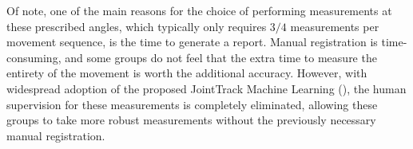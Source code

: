 Of note, one of the main reasons for the choice of performing measurements at these prescribed angles, which typically only requires $3/4$ measurements per movement sequence, is the time to generate a report.
Manual registration is time-consuming, and some groups do not feel that the extra time to measure the entirety of the movement is worth the additional accuracy.
However, with widespread adoption of the proposed JointTrack Machine Learning (), the human supervision for these measurements is completely eliminated, allowing these groups to take more robust measurements without the previously necessary manual registration.



